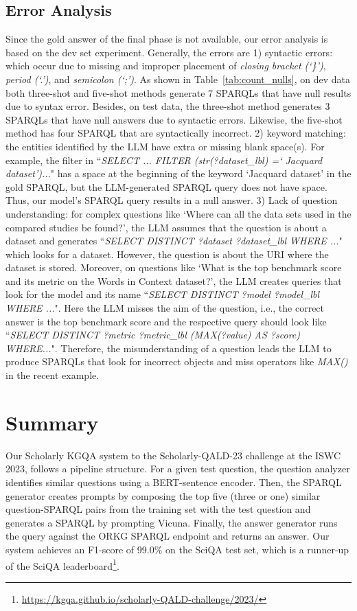 \documentclass[
]{ceurart}
\begin{document}
\subsection{Error Analysis}\label{erroranalysis}

Since the gold answer of the final phase is not available, our error analysis is based on the dev set experiment. Generally, the errors are 1) syntactic errors: which occur due to missing and improper placement of \textit{closing bracket (`\}')}, \textit{period (`.')}, and \textit{semicolon (`;')}. As shown in Table~\ref{tab:count_nulls}, on dev data both three-shot and five-shot methods generate 7 SPARQLs that have null results due to syntax error. Besides, on test data, the three-shot method generates 3 SPARQLs that have null answers due to syntactic errors. Likewise, the five-shot method has four SPARQL that are syntactically incorrect. 2) keyword matching: the entities identified by the LLM have extra or missing blank space(s). For example, the filter in ``\textit{SELECT ... FILTER (str(?dataset\_lbl) =` Jacquard dataset')...}" has a space at the beginning of the keyword `Jacquard dataset' in the gold SPARQL, but the LLM-generated SPARQL query does not have space. Thus, our model's SPARQL query results in a null answer. 3) Lack of question understanding: for complex questions like `Where can all the data sets used in the compared studies be found?', the LLM assumes that the question is about a dataset and generates ``\textit{SELECT DISTINCT ?dataset ?dataset\_lbl WHERE ...}" which looks for a dataset. However, the question is about the URI where the dataset is stored. Moreover, on questions like `What is the top benchmark score and its metric on the Words in Context dataset?', the LLM creates queries that look for the model and its name ``\textit{SELECT DISTINCT ?model ?model\_lbl WHERE ...}". Here the LLM misses the aim of the question, i.e., the correct answer is the top benchmark score and the respective query should look like ``\textit{SELECT DISTINCT ?metric ?metric\_lbl (MAX(?value) AS ?score) WHERE...}". Therefore, the misunderstanding of a question leads the LLM to produce SPARQLs that look for incorrect objects and miss operators like \textit{MAX()} in the recent example.

\section{Summary}\label{summary}

Our Scholarly KGQA system to the Scholarly-QALD-23 challenge at the ISWC 2023, follows a pipeline structure. For a given test question, the question analyzer identifies similar questions using a BERT-sentence encoder. Then, the SPARQL generator creates prompts by composing the top five (three or one) similar question-SPARQL pairs from the training set with the test question and generates a SPARQL by prompting Vicuna. Finally, the answer generator runs the query against the ORKG SPARQL endpoint and returns an answer. Our system achieves an F1-score of 99.0\% on the SciQA test set, which is a runner-up of the SciQA leaderboard\footnote{\url{https://kgqa.github.io/scholarly-QALD-challenge/2023/}}.
\end{document}
